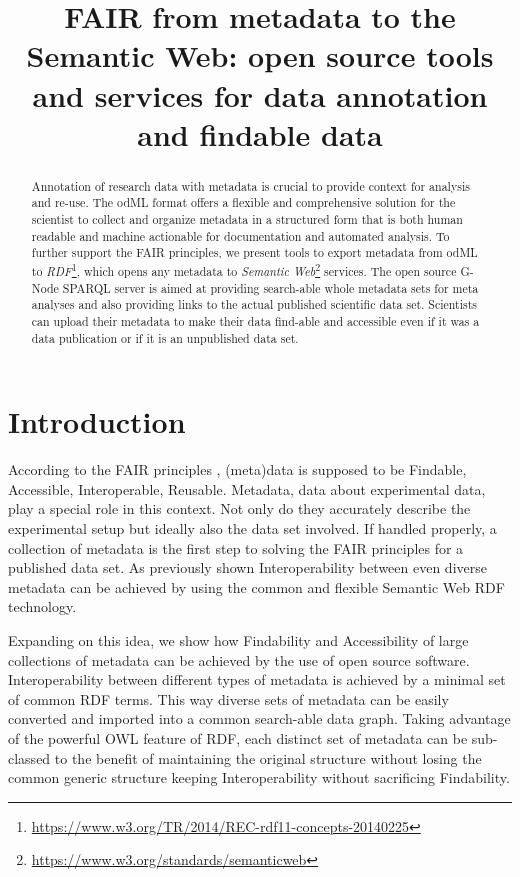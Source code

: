 \documentclass{article}
\title{FAIR from metadata to the Semantic Web: open source tools and services for data annotation and findable data}
\begin{document}
\maketitle

\begin{abstract}
Annotation of research data with metadata is crucial to provide context for analysis and  re-use. The odML format offers a flexible and comprehensive solution for the scientist to collect and organize metadata in a structured form that is both human readable and machine actionable for documentation and automated analysis. To further support the FAIR principles, we present tools to export metadata from odML to \textit{RDF}\footnote{\url{https://www.w3.org/TR/2014/REC-rdf11-concepts-20140225}}, which opens any metadata to \textit{Semantic Web}\footnote{\url{https://www.w3.org/standards/semanticweb}} services. The open source G-Node SPARQL server is aimed at providing search-able whole metadata sets for meta analyses and also providing links to the actual published scientific data set. Scientists can upload their metadata to make their data find-able and accessible even if it was a data publication or if it is an unpublished data set.
\end{abstract}

\section{Introduction} \label{sec:introduction}
According to the FAIR principles \cite{Wilkinson_2016}, (meta)data is supposed to be Findable, Accessible, Interoperable, Reusable. Metadata, data about experimental data, play a special role in this context. Not only do they accurately describe the experimental setup but ideally also the data set involved. If handled properly, a collection of metadata is the first step to solving the FAIR principles for a published data set. As previously shown \cite{Teeters_2017} Interoperability between even diverse metadata can be achieved by using the common and flexible Semantic Web RDF technology.

Expanding on this idea, we show how Findability and Accessibility of large collections of metadata can be achieved by the use of open source software. Interoperability between different types of metadata is achieved by a minimal set of common RDF terms. This way diverse sets of metadata can be easily converted and imported into a common search-able data graph. Taking advantage of the powerful OWL feature of RDF, each distinct set of metadata can be sub-classed to the benefit of maintaining the original structure without losing the common generic structure keeping Interoperability without sacrificing Findability.
\end{document}
